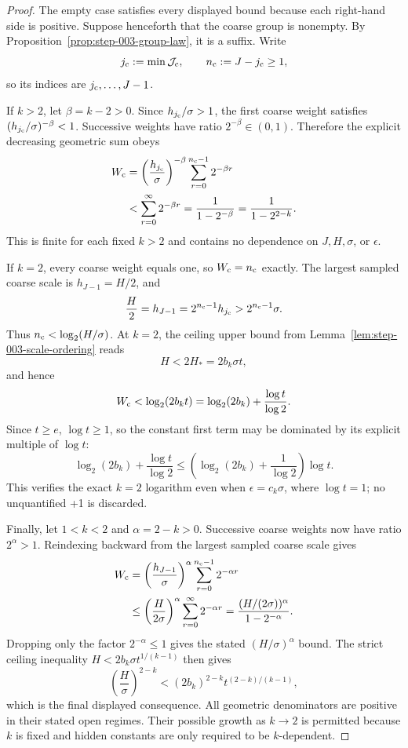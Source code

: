 \begin{proof}
The empty case satisfies every displayed bound
because each right-hand side is positive. Suppose henceforth that the coarse
group is nonempty. By Proposition~\ref{prop:step-003-group-law}, it is a
suffix. Write
\[
j_{\rm c}:=\min\mathcal J_{\rm c},
\qquad n_{\rm c}:=J-j_{\rm c}\geq1,
\]
so its indices are \(j_{\rm c},\ldots,J-1\).

If \(k>2\), let \(\beta=k-2>0\). Since
\(h_{j_{\rm c}}/\sigma>1\), the first coarse weight satisfies
\((h_{j_{\rm c}}/\sigma)^{-\beta}<1\). Successive weights have ratio
\(2^{-\beta}\in(0,1)\). Therefore the explicit decreasing geometric sum
obeys
\[
\begin{aligned}
W_{\rm c}
&=\left(\frac{h_{j_{\rm c}}}{\sigma}\right)^{-\beta}
  \sum_{r=0}^{n_{\rm c}-1}2^{-\beta r}\\
&<\sum_{r=0}^{\infty}2^{-\beta r}
=\frac1{1-2^{-\beta}}
=\frac1{1-2^{2-k}}.
\end{aligned}
\]
This is finite for each fixed \(k>2\) and contains no dependence on
\(J,H,\sigma\), or \(\epsilon\).

If \(k=2\), every coarse weight equals one, so
\(W_{\rm c}=n_{\rm c}\) exactly. The largest sampled coarse scale is
\(h_{J-1}=H/2\), and
\[
\frac{H}{2}=h_{J-1}
=2^{n_{\rm c}-1}h_{j_{\rm c}}
>2^{n_{\rm c}-1}\sigma.
\]
Thus \(n_{\rm c}<\log_2(H/\sigma)\). At \(k=2\), the ceiling upper bound
from Lemma~\ref{lem:step-003-scale-ordering} reads
\[
H<2H_*=2b_k\sigma t,
\]
and hence
\[
W_{\rm c}<\log_2(2b_k t)
=\log_2(2b_k)+\frac{\log t}{\log 2}.
\]
Since \(t\geq e\), \(\log t\geq1\), so the constant first term may be
dominated by its explicit multiple of \(\log t\):
\[
\log_2(2b_k)+\frac{\log t}{\log 2}
\leq
\left(\log_2(2b_k)+\frac1{\log 2}\right)\log t.
\]
This verifies the exact \(k=2\) logarithm even when
\(\epsilon=c_k\sigma\), where \(\log t=1\); no unquantified +1 is
discarded.

Finally, let \(1<k<2\) and \(\alpha=2-k>0\). Successive coarse weights now
have ratio \(2^\alpha>1\). Reindexing backward from the largest sampled
coarse scale gives
\[
\begin{aligned}
W_{\rm c}
&=\left(\frac{h_{J-1}}{\sigma}\right)^\alpha
  \sum_{r=0}^{n_{\rm c}-1}2^{-\alpha r}\\
&\leq\left(\frac{H}{2\sigma}\right)^\alpha
  \sum_{r=0}^{\infty}2^{-\alpha r}
=\frac{(H/(2\sigma))^\alpha}{1-2^{-\alpha}}.
\end{aligned}
\]
Dropping only the factor \(2^{-\alpha}\leq1\) gives the stated
\((H/\sigma)^\alpha\) bound. The strict ceiling inequality
\(H<2b_k\sigma t^{1/(k-1)}\) then gives
\[
\left(\frac H\sigma\right)^{2-k}
<(2b_k)^{2-k}t^{(2-k)/(k-1)},
\]
which is the final displayed consequence. All geometric denominators are
positive in their stated open regimes. Their possible growth as \(k\to2\)
is permitted because \(k\) is fixed and hidden constants are only required to
be \(k\)-dependent.
\end{proof}

